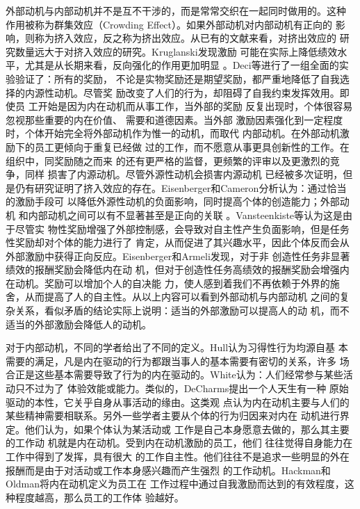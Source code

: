 外部动机与内部动机并不是互不干涉的，而是常常交织在一起同时做用的。这种
作用被称为群集效应（Crowding Effect）。如果外部动机对内部动机有正向的
影响，则称为挤入效应，反之称为挤出效应。从已有的文献来看，对挤出效应的
研究数量远大于对挤入效应的研究。Kruglanski发现激励
可能在实际上降低绩效水平，尤其是从长期来看，反向强化的作用更加明显
\cite{Kruglanski1978}。Deci等进行了一组全面的实验验证了：所有的奖励，
不论是实物奖励还是期望奖励，都严重地降低了自我选择的内源性动机。尽管奖
励改变了人们的行为，却阻碍了自我约束发挥效用\cite{deci1999mar}。即使员
工开始是因为内在动机而从事工作，当外部的奖励
反复出现时，个体很容易忽视那些重要的内在价值、
需要和道德因素\cite{deci2000agp}。当外部
激励因素强化到一定程度时，个体开始完全将外部动机作为惟一的动机，而取代
内部动机\cite{kasser2002hpm}。在外部动机激励下的员工更倾向于重复已经做
过的工作，而不愿意从事更具创新性的工作\cite{amabile1998kc,schwartz1993cad}。在组织中，同奖励随之而来
的还有更严格的监督，更频繁的评审以及更激烈的竞争\cite{Kohn1993}，同样
损害了内源动机\cite{deci1985ima}。尽管外源性动机会损害内源动机
已经被多次证明，但是仍有研究证明了挤入效应的存在。Eisenberger和Cameron分析认为：通过恰当的激励手段可
以降低外源性动机的负面影响，同时提高个体的创造能力；外部动机
和内部动机之间可以有不显著甚至是正向的关联
\cite{eisenberger1996der}。Vansteenkiste等认为这是由于尽管实
物性奖励增强了外部控制感，会导致对自主性产生负面影响，但是任务性奖励却对个体的能力进行了
肯定，从而促进了其兴趣水平，因此个体反而会从外部激励中获得正向反应\cite{vansteenkiste2003ccr}。Eisenberger和Armeli发现，对于非
创造性任务非显著绩效的报酬奖励会降低内在动
机，但对于创造性任务高绩效的报酬奖励会增强内
在动机\cite{eisenberger1997csr}。奖励可以增加个人的自决能
力，使人感到着我们不再依赖于外界的施舍，从而提高了人的自主性\cite{eisenberger1999dpp,eisenberger1999eri}。从以上内容可以看到外部动机与内部动机
之间的复杂关系，看似矛盾的结论实际上说明：适当的外部激励可以提高人的动
机，而不适当的外部激励会降低人的动机。



对于内部动机，不同的学者给出了不同的定义。Hull认为习得性行为均源自基
本需要的满足，凡是内在驱动的行为都跟当事人的基本需要有密切的关系，许多
场合正是这些基本需要导致了行为的内在驱动的\cite{hull1943pbi}。White认为：人们经常参与某些活动只不过为了
体验效能或能力\cite{white66wmr}。类似的，DeCharms提出一个人天生有一种
原始驱动的本性，它关乎自身从事活动的缘由\cite{decharms1968pci}。这类观
点认为内在动机主要与人们的某些精神需要相联系\cite{Kanfer1990}。另外一些学者主要从个体的行为归因来对内在
动机进行界定。他们认为，如果个体认为某活动或
工作是自己本身愿意去做的，那么其主要的工作动
机就是内在动机。受到内在动机激励的员工，他们
往往觉得自身能力在工作中得到了发挥，具有很大
的工作自主性。他们往往不是追求一些明显的外在
报酬而是由于对活动或工作本身感兴趣而产生强烈
的工作动机\cite{chenandwu2008}。Hackman和Oldman将内在动机定义为员工在
工作过程中通过自我激励而达到的有效程度，这种程度越高，那么员工的工作体
验越好\cite{hackman1975djd}。

